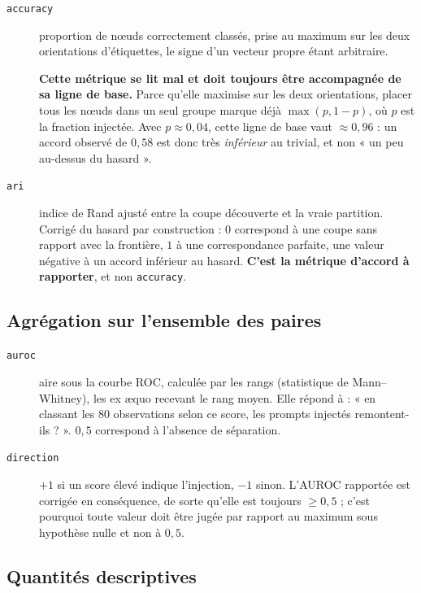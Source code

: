 \documentclass[11pt,a4paper]{article}
\begin{document}
\begin{description}
\item[\texttt{accuracy}] proportion de n\oe uds correctement classés, prise au
  maximum sur les deux orientations d'étiquettes, le signe d'un vecteur propre
  étant arbitraire.

  \textbf{Cette métrique se lit mal et doit toujours être accompagnée de sa
  ligne de base.} Parce qu'elle maximise sur les deux orientations, placer tous
  les n\oe uds dans un seul groupe marque déjà $\max(p, 1-p)$, où $p$ est la
  fraction injectée. Avec $p \approx 0{,}04$, cette ligne de base vaut
  $\approx 0{,}96$ : un accord observé de $0{,}58$ est donc très
  \emph{inférieur} au trivial, et non « un peu au-dessus du hasard ».

\item[\texttt{ari}] indice de Rand ajusté entre la coupe découverte et la vraie
  partition. Corrigé du hasard par construction : $0$ correspond à une coupe
  sans rapport avec la frontière, $1$ à une correspondance parfaite, une valeur
  négative à un accord inférieur au hasard. \textbf{C'est la métrique d'accord
  à rapporter}, et non \texttt{accuracy}.
\end{description}

\subsection{Agrégation sur l'ensemble des paires}

\begin{description}
\item[\texttt{auroc}] aire sous la courbe ROC, calculée par les rangs
  (statistique de Mann--Whitney), les ex \ae quo recevant le rang moyen. Elle
  répond à : « en classant les 80 observations selon ce score, les prompts
  injectés remontent-ils ? ». $0{,}5$ correspond à l'absence de séparation.

\item[\texttt{direction}] $+1$ si un score élevé indique l'injection, $-1$
  sinon. L'AUROC rapportée est corrigée en conséquence, de sorte qu'elle est
  toujours $\ge 0{,}5$ ; c'est pourquoi toute valeur doit être jugée par
  rapport au maximum sous hypothèse nulle et non à $0{,}5$.
\end{description}

\subsection{Quantités descriptives}
\end{document}
